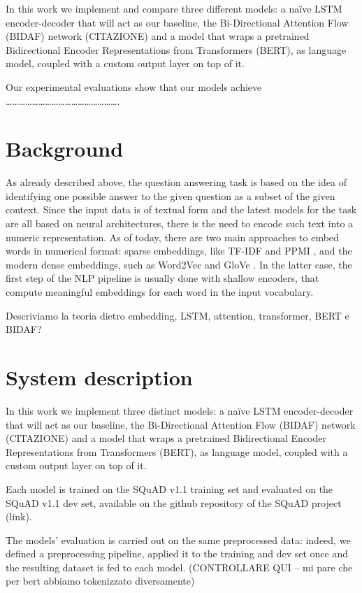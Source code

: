 \documentclass[a4paper,10pt]{report}
\begin{document}
In this work we implement and compare three different models: a naïve LSTM encoder-decoder that will act as our baseline, the Bi-Directional Attention Flow (BIDAF) network (CITAZIONE) and a model that wraps a pretrained Bidirectional Encoder Representations from Transformers (BERT), as language model, coupled with a custom output layer on top of it.

Our experimental evaluations show that our models achieve …………………………………………….

\chapter{Background}\label{chap:background}

As already described above, the question answering task is based on the idea of identifying one possible answer to the given question as a subset of the given context. Since the input data is of textual form and the latest models for the task are all based on neural architectures, there is the need to encode such text into a numeric representation. As of today, there are two main approaches to embed words in numerical format: sparse embeddings, like TF-IDF \cite{tf-idf} and PPMI \cite{ppmi}, and the modern dense embeddings, such as Word2Vec \cite{word2vec} and GloVe \cite{glove}. In the latter case, the first step of the NLP pipeline is usually done with shallow encoders, that compute meaningful embeddings for each word in the input vocabulary. 

Descriviamo la teoria dietro embedding, LSTM, attention, transformer, BERT e BIDAF?

\chapter{System description}\label{chap:system-description}

In this work we implement three distinct models: a naïve LSTM encoder-decoder that will act as our baseline, the Bi-Directional Attention Flow (BIDAF) network (CITAZIONE) and a model that wraps a pretrained Bidirectional Encoder Representations from Transformers (BERT), as language model, coupled with a custom output layer on top of it.

Each model is trained on the SQuAD v1.1 training set and evaluated on the SQuAD v1.1 dev set, available on the github repository of the SQuAD project (link).

The models’ evaluation is carried out on the same preprocessed data: indeed, we defined a preprocessing pipeline, applied it to the training and dev set once and the resulting dataset is fed to each model. (CONTROLLARE QUI – mi pare che per bert abbiamo tokenizzato diversamente)
\end{document}

